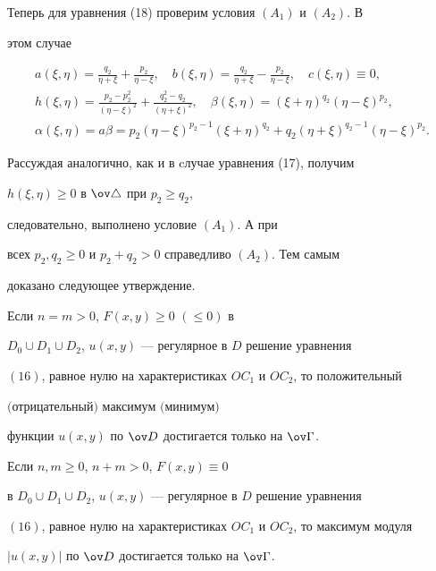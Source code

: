 Теперь для уравнения (18) проверим условия $(A_1)$ и $(A_2)$. В 


этом случае 


\begin{gather*}


a(\xi,\eta)=\frac{q_2}{\eta +\xi }+\frac{p_2}{\eta 


-\xi},\quad b(\xi,\eta)=\frac{q_2}{\eta +\xi }-\frac{p_2}{\eta 


-\xi },\quad c(\xi,\eta)\equiv 0,\\


%


h(\xi,\eta)=\frac{p_2-p_2^2}{(\eta -\xi 


)^2}+\frac{q_2^2-q_2}{(\eta +\xi)^2},\quad \beta (\xi,\eta 


)=(\xi +\eta)^{q_2}(\eta -\xi)^{p_2},\\


%


\alpha(\xi,\eta)=a\beta=p_2(\eta -\xi)^{p_2-1}(\xi +


\eta)^{q_2}+q_2(\eta +\xi)^{q_2-1}(\eta -\xi)^{p_2}.


\end{gather*}


Рассуждая аналогично, как и в cлучае уравнения (17), получим


$h(\xi,\eta)\ge 0$ в $ \ov \triangle$ при $p_2\ge q_2$,


следовательно, выполнено условие $(A_1)$. А при 


всех $p_2,q_2\ge 0$ и $p_2+q_2>0 $ справедливо $(A_2)$. Тем самым 


доказано следующее утверждение.





\begin{thm}


Если $n=m>0$, $F(x,y)\ge 0$ $(\le 0)$ в 


$D_0\cup D_1\cup D_2$, $u(x,y)$ --- регулярное в $D$ решение уравнения


$(16)$, равное нулю на характеристиках $OC_1$ и $OC_2$, то положительный


$($отрицательный$)$ максимум $($минимум$)$


функции $u(x,y)$ по $\ov D$ достигается только на $\ov \Gamma$.





Если $n,m\ge 0$, $n+m>0$, $F(x,y)\equiv 0$


в $D_0\cup D_1\cup D_2$, $u(x,y)$ --- регулярное в $D$ решение уравнения


$(16)$, равное нулю на характеристиках $OC_1$ и $OC_2$, то максимум модуля


$|u(x,y)|$ по $\ov D$ достигается только на $\ov \Gamma$.


\end{thm}





